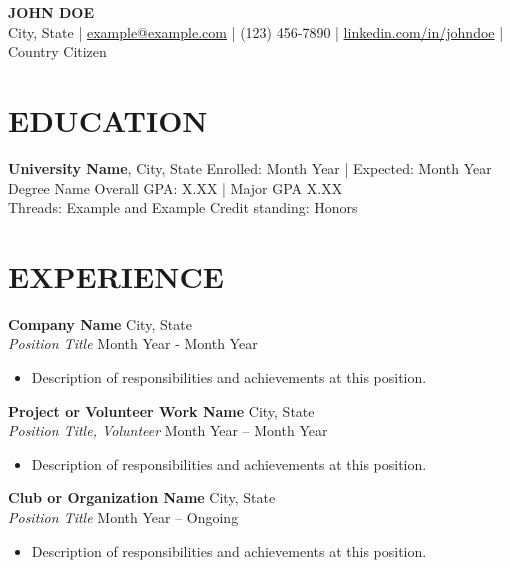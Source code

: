 \documentclass[a4paper,10pt]{extarticle}
\begin{document}
\pagestyle{empty}

\begin{center}
\textbf{\Large JOHN DOE}\\[2pt] %
City, State | \href{mailto:example@example.com}{example@example.com} | (123) 456-7890 | \href{https://www.linkedin.com/in/johndoe}{linkedin.com/in/johndoe} | Country Citizen %
\end{center}

\section*{EDUCATION}
\noindent
\textbf{University Name}, City, State \hfill Enrolled: Month Year | Expected: Month Year\\ %
Degree Name \hfill Overall GPA: X.XX | Major GPA X.XX\\ %
Threads: Example and Example \hfill Credit standing: Honors %

\section*{EXPERIENCE}
\noindent
\textbf{Company Name} \hfill City, State\\ %
\textit{Position Title} \hfill Month Year - Month Year %
\begin{itemize}
    \item Description of responsibilities and achievements at this position. %
\end{itemize}

\noindent
\textbf{Project or Volunteer Work Name} \hfill City, State\\ %
\textit{Position Title, Volunteer} \hfill Month Year – Month Year %
\begin{itemize}
    \item Description of responsibilities and achievements at this position. %
\end{itemize}

\textbf{Club or Organization Name} \hfill City, State\\ %
\textit{Position Title} \hfill Month Year – Ongoing %
\begin{itemize}
    \item Description of responsibilities and achievements at this position. %
\end{itemize}
\end{document}
